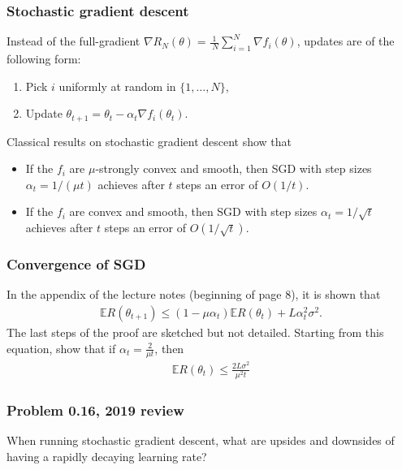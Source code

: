 \documentclass{beamer}
\begin{document}
\begin{frame}[t]
\frametitle{Stochastic gradient descent}
\vspace{-5pt}
Instead of the full-gradient $\nabla R_N (\theta) = \frac{1}{􏰍N} \sum_{i=1}^N \nabla f_i(\theta)$, updates are of the following form:
\begin{enumerate}
\item Pick $i$ uniformly at random in $\{1, \dots , N\}$, 
\item Update $\theta_{t+1} = \theta_t - \alpha_t \nabla f_i(\theta_t)$.
\end{enumerate}
Classical results on stochastic gradient descent show that
\begin{itemize}
\item If the $f_i$ are $\mu$-strongly convex and smooth, then SGD with step sizes $\alpha_t = 1/(\mu t)$ achieves after $t$ steps an error of $O(1/t)$.
\item If the $f_i$ are convex and smooth, then SGD with step sizes $\alpha_t = 1/\sqrt{t}$ achieves after $t$ steps an
 error of $O(1/\sqrt{t})$.
 \end{itemize}
\end{frame}

\begin{frame}[t]
\frametitle{Convergence of SGD}
\vspace{-5pt}
In the appendix of the lecture notes (beginning of page 8), it is shown that
\vspace{-5pt}
\begin{align*}
\mathbb{E} R(\theta_{t+1}) \leq (1 - \mu \alpha_t) \mathbb{E} R(\theta_t) + L \alpha_t^2 \sigma^2.
\end{align*}
The last steps of the proof are sketched but not detailed. Starting from this equation, show that if $\alpha_t = \frac{2}{\mu t}$, then
\vspace{-5pt}
\begin{align*}
\mathbb{E}R(\theta_t) \leq \frac{2L \sigma^2}{\mu^2 t}
\end{align*}
\pause
\end{frame}

\begin{frame}[t]
\frametitle{Problem 0.16, 2019 review}
\vspace{-5pt}
When running stochastic gradient descent, what are upsides and downsides of having a rapidly decaying learning rate?
\pause
\end{frame}


\begin{frame}[t]
\pause
\pause
\pause
\pause
\end{frame}
\end{document}
